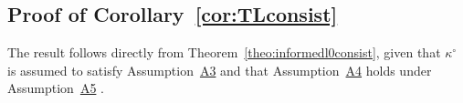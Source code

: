\documentclass[
  12pt]{article}
\begin{document}
\subsection{Proof of Corollary~\ref{cor:TLconsist}}

The result follows directly from Theorem~\ref{theo:informedl0consist}, given that $\kappa^{\circ}$ is assumed to satisfy Assumption~\hyperlink{lab:A3}{A3} and that
Assumption~\hyperlink{lab:A4}{A4} holds under Assumption~\hyperlink{lab:A5}{A5} .



\end{document}
